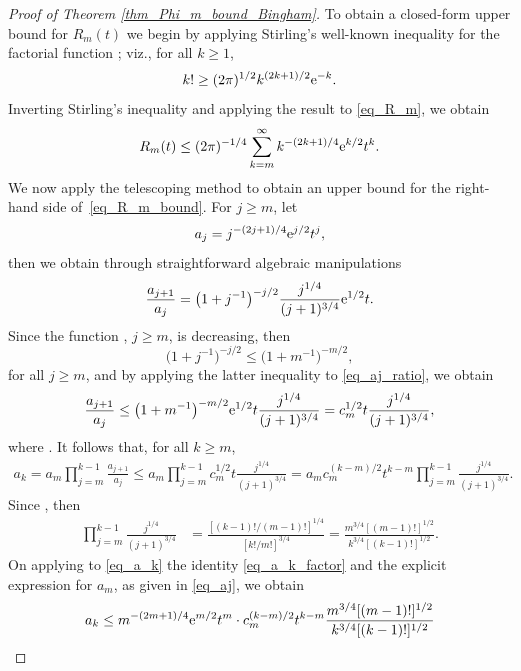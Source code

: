 \documentclass[pdftex]{sigma}
\numberwithin{equation}{section}
\begin{document}
\begin{proof}[Proof of Theorem \ref{thm_Phi_m_bound_Bingham}]
To obtain a closed-form upper bound for $R_m(t)$ we begin by applying Stirling's well-known inequality for the factorial function \cite[Theorem 1]{Impens}; viz., for all $k \ge 1$,
\[
k! \ge (2\pi)^{1/2} k^{(2k+1)/2} {\rm e}^{-k}.
\]
Inverting Stirling's inequality and applying the result to \eqref{eq_R_m}, we obtain
\begin{equation}
\label{eq_R_m_bound}
R_m(t) \le (2\pi)^{-1/4} \sum_{k=m}^\infty k^{-(2k+1)/4} {\rm e}^{k/2} t^k.
\end{equation}
We now apply the telescoping method to obtain an upper bound for the right-hand side of~\eqref{eq_R_m_bound}. For $j \ge m$, let
\begin{equation}
\label{eq_aj}
a_j = j^{-(2j+1)/4} {\rm e}^{j/2} t^j,
\end{equation}
then we obtain through straightforward algebraic manipulations
\begin{equation}
\label{eq_aj_ratio}
\frac{a_{j+1}}{a_j} = \bigl(1+j^{-1}\bigr)^{-j/2} \frac{j^{1/4}}{(j+1)^{3/4}} {\rm e}^{1/2} t.
\end{equation}
Since the function , $j \ge m$, is decreasing, then
\begin{equation}
\label{eq_c_m}
\bigl(1+j^{-1}\bigr)^{-j/2} \le \bigl(1+m^{-1}\bigr)^{-m/2},
\end{equation}
for all $j \ge m$, and by applying the latter inequality to \eqref{eq_aj_ratio}, we obtain
\[
\frac{a_{j+1}}{a_j} \le \bigl(1+m^{-1}\bigr)^{-m/2} {\rm e}^{1/2} t \frac{j^{1/4}}{(j+1)^{3/4}}
= c_m^{1/2} t \frac{j^{1/4}}{(j+1)^{3/4}},
\]
where . It follows that, for all $k \ge m$,
\begin{align}
\label{eq_a_k}
a_k = a_m \prod_{j=m}^{k-1} \frac{a_{j+1}}{a_j}
\le a_m \prod_{j=m}^{k-1} c_m^{1/2} t \frac{j^{1/4}}{(j+1)^{3/4}}= a_m c_m^{(k-m)/2} t^{k-m} \prod_{j=m}^{k-1} \frac{j^{1/4}}{(j+1)^{3/4}}.
\end{align}
Since , then
\begin{align}
\label{eq_a_k_factor}
\prod_{j=m}^{k-1} \frac{j^{1/4}}{(j+1)^{3/4}} &= \frac{[(k-1)!/(m-1)!]^{1/4}}{[k!/m!]^{3/4}}
= \frac{m^{3/4} [(m-1)!]^{1/2}}{k^{3/4} [(k-1)!]^{1/2}}.
\end{align}
On applying to \eqref{eq_a_k} the identity \eqref{eq_a_k_factor} and the explicit expression for $a_m$, as given in \eqref{eq_aj}, we obtain
\begin{align}
\label{eq_a_k_bound}
a_k &\le m^{-(2m+1)/4} {\rm e}^{m/2} t^m \cdot c_m^{(k-m)/2} t^{k-m} \frac{m^{3/4} [(m-1)!]^{1/2}}{k^{3/4} [(k-1)!]^{1/2}} \nonumber \\

\end{align}
\end{proof}
\end{document}
